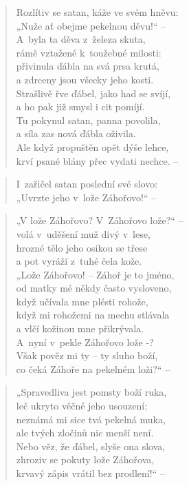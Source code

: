 \begin{verse}
Rozlítiv se satan, káže ve svém hněvu: \\
„Nuže ať obejme pekelnou děvu!“ -- \\
A~byla ta děva z~železa skuta, \\
rámě vztažené k~toužebné milosti: \\
přivinula ďábla na svá prsa krutá, \\
a zdrceny jsou všecky jeho kosti. \\
Strašlivě řve ďábel, jako had se svíjí, \\
a ho pak již smysl i cit pomíjí. \\
Tu pokynul satan, panna povolila, \\
a síla zas nová ďábla oživila. \\
Ale když propuštěn opět dýše lehce, \\
krví psané blány přec vydati nechce. --
\end{verse}

\begin{verse}
I~zařičel satan poslední své slovo: \\
„Uvrzte jeho v~lože Záhořovo!“ --
\end{verse}

\begin{verse}
„V lože Záhořovo? V~Záhořovo lože?“ -- \\
volá v~uděšení muž divý v~lese, \\
hrozné tělo jeho osikou se třese \\
a pot vyráží z~tuhé čela kože. \\
„Lože Záhořovo! -- Záhoř je to jméno, \\
od matky mé někdy často vysloveno, \\
když učívala mne plésti rohože, \\
když mi rohožemi na mechu stlávala \\
a vlčí kožinou mne přikrývala. \\
A~nyní v~pekle Záhořovo lože -? \\
Však pověz mi ty -- ty sluho boží, \\
co čeká Záhoře na pekelném loži?“ --
\end{verse}

\begin{verse}
„Spravedliva jest pomsty boží ruka, \\
leč ukryto věčné jeho usouzení: \\
neznámá mi sice tvá pekelná muka, \\
ale tvých zločinů nic menší není. \\
Nebo věz, že ďábel, slyše ona slova, \\
zhroziv se pokuty lože Záhořova, \\
krvavý zápis vrátil bez prodlení!“ --
\end{verse}

